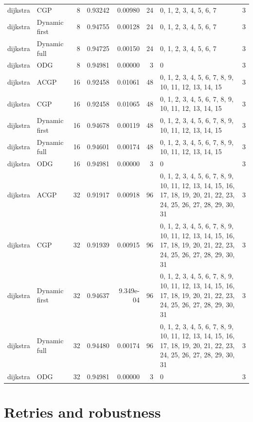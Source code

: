 \documentclass[10pt,a4paper]{article}
\begin{document}
\begin{longtable}{@{}p{23mm}p{29mm}rrrrp{36mm}r@{}}
dijkstra & CGP & 8 & 0.93242 & 0.00980 & 24 & 0, 1, 2, 3, 4, 5, 6, 7 & 3 \\
dijkstra & Dynamic first & 8 & 0.94755 & 0.00128 & 24 & 0, 1, 2, 3, 4, 5, 6, 7 & 3 \\
dijkstra & Dynamic full & 8 & 0.94725 & 0.00150 & 24 & 0, 1, 2, 3, 4, 5, 6, 7 & 3 \\
dijkstra & ODG & 8 & 0.94981 & 0.00000 & 3 & 0 & 3 \\
dijkstra & ACGP & 16 & 0.92458 & 0.01061 & 48 & 0, 1, 2, 3, 4, 5, 6, 7, 8, 9, 10, 11, 12, 13, 14, 15 & 3 \\
dijkstra & CGP & 16 & 0.92458 & 0.01065 & 48 & 0, 1, 2, 3, 4, 5, 6, 7, 8, 9, 10, 11, 12, 13, 14, 15 & 3 \\
dijkstra & Dynamic first & 16 & 0.94678 & 0.00119 & 48 & 0, 1, 2, 3, 4, 5, 6, 7, 8, 9, 10, 11, 12, 13, 14, 15 & 3 \\
dijkstra & Dynamic full & 16 & 0.94601 & 0.00174 & 48 & 0, 1, 2, 3, 4, 5, 6, 7, 8, 9, 10, 11, 12, 13, 14, 15 & 3 \\
dijkstra & ODG & 16 & 0.94981 & 0.00000 & 3 & 0 & 3 \\
dijkstra & ACGP & 32 & 0.91917 & 0.00918 & 96 & 0, 1, 2, 3, 4, 5, 6, 7, 8, 9, 10, 11, 12, 13, 14, 15, 16, 17, 18, 19, 20, 21, 22, 23, 24, 25, 26, 27, 28, 29, 30, 31 & 3 \\
dijkstra & CGP & 32 & 0.91939 & 0.00915 & 96 & 0, 1, 2, 3, 4, 5, 6, 7, 8, 9, 10, 11, 12, 13, 14, 15, 16, 17, 18, 19, 20, 21, 22, 23, 24, 25, 26, 27, 28, 29, 30, 31 & 3 \\
dijkstra & Dynamic first & 32 & 0.94637 & 9.349e-04 & 96 & 0, 1, 2, 3, 4, 5, 6, 7, 8, 9, 10, 11, 12, 13, 14, 15, 16, 17, 18, 19, 20, 21, 22, 23, 24, 25, 26, 27, 28, 29, 30, 31 & 3 \\
dijkstra & Dynamic full & 32 & 0.94480 & 0.00174 & 96 & 0, 1, 2, 3, 4, 5, 6, 7, 8, 9, 10, 11, 12, 13, 14, 15, 16, 17, 18, 19, 20, 21, 22, 23, 24, 25, 26, 27, 28, 29, 30, 31 & 3 \\
dijkstra & ODG & 32 & 0.94981 & 0.00000 & 3 & 0 & 3 \\
\end{longtable}\normalsize\setlength{\tabcolsep}{6pt}
\clearpage
\section*{Retries and robustness}
\clearpage
\end{document}

